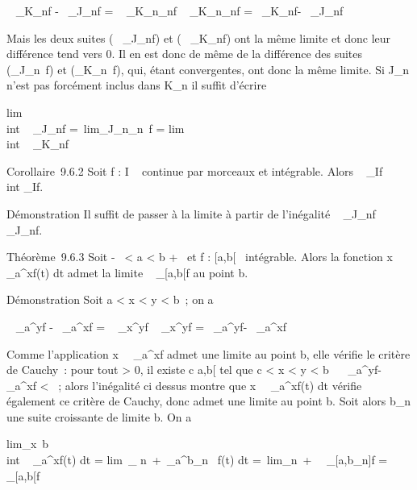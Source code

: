 \documentclass[]{article}
\begin{document}
\left \textbar{}\int ~
\_K\_nf -\int ~
\_J\_nf\right \textbar{} =
\left \textbar{}\int ~
\_K\_n\diagdownJ\_nf\right
\textbar{}\leq\int ~
\_K\_n\diagdownJ\_n\textbar{}f\textbar{}
=\int ~
\_K\_n\textbar{}f\textbar{}-\int ~
\_J\_n\textbar{}f\textbar{}

Mais les deux suites (\int ~
\_J\_n\textbar{}f\textbar{}) et
(\int ~
\_K\_n\textbar{}f\textbar{}) ont la même limite et donc
leur différence tend vers 0. Il en est donc de même de la différence des
suites (\int  \_J\_n~f) et
(\int  \_K\_n~f), qui, étant
convergentes, ont donc la même limite. Si J\_n n'est pas
forcément inclus dans K\_n il suffit d'écrire

lim\\int ~
\_J\_nf =\
lim\int  \_J\_n\cupK\_n~f
= lim\\int ~
\_K\_nf

Corollaire~9.6.2 Soit f : I \rightarrow~  continue par morceaux et intégrable.
Alors \left \textbar{}\int ~
\_If\right \textbar{}\leq\\int
 \_I\textbar{}f\textbar{}.

Démonstration Il suffit de passer à la limite à partir de l'inégalité
\left \textbar{}\int ~
\_J\_nf\right \textbar{}
\leq\int ~
\_J\_n\textbar{}f\textbar{}.

Théorème~9.6.3 Soit -\infty~ \textless{} a \textless{} b \leq +\infty~ et f :
{[}a,b{[}\rightarrow~ \mathbb{C} intégrable. Alors la fonction
x\mapsto~\int ~
\_a^xf(t) dt admet la limite \int ~
\_{[}a,b{[}f au point b.

Démonstration Soit a \textless{} x \textless{} y \textless{} b~; on a

\left \textbar{}\int ~
\_a^yf -\int ~
\_a^xf\right \textbar{} =
\left \textbar{}\int ~
\_x^yf\right
\textbar{}\leq\int ~
\_x^y\textbar{}f\textbar{} =\int ~
\_a^y\textbar{}f\textbar{}-\int ~
\_a^x\textbar{}f\textbar{}

Comme l'application
x\mapsto~\int ~
\_a^x\textbar{}f\textbar{} admet une limite au point b,
elle vérifie le critère de Cauchy~: pour tout \epsilon \textgreater{} 0, il
existe c \in {[}a,b{[} tel que c \textless{} x \textless{} y \textless{} b
\rigtharrow~\left \textbar{}\int ~
\_a^y\textbar{}f\textbar{}-\int ~
\_a^x\textbar{}f\textbar{}\right \textbar{}
\textless{} \epsilon~; alors l'inégalité ci dessus montre que
x\mapsto~\int ~
\_a^xf(t) dt vérifie également ce critère de Cauchy, donc
admet une limite au point b. Soit alors b\_n une suite
croissante de limite b. On a

lim\_x\rightarrow~b\\int ~
\_a^xf(t) dt = lim~\_
n\rightarrow~+\infty~\int  \_a^b\_n ~f(t)
dt =\
lim\_n\rightarrow~+\infty~\int ~
\_{[}a,b\_n{]}f =\int ~
\_{[}a,b{[}f
\end{document}
